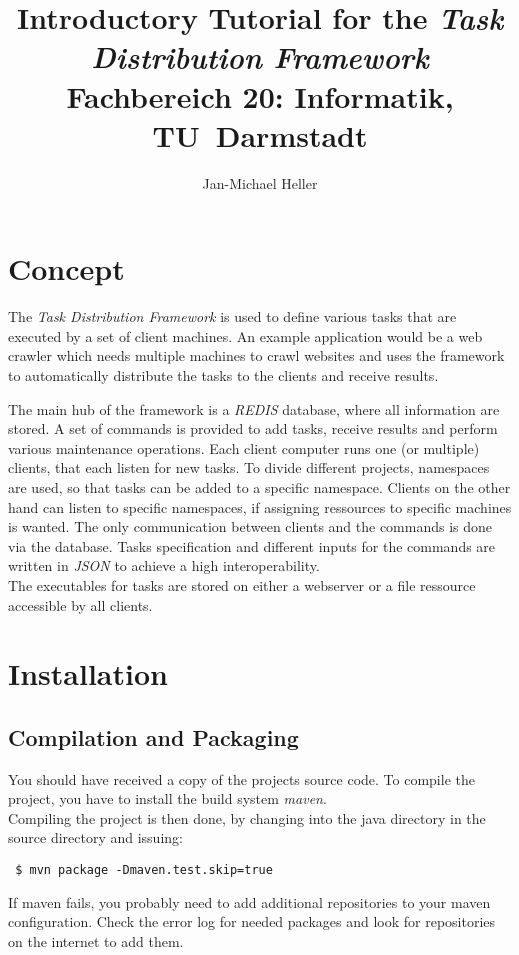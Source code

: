\documentclass[a4paper,11pt]{article}
\title{Introductory Tutorial for the \textit{Task Distribution Framework}
Fachbereich 20: Informatik, \mbox{TU Darmstadt}}
\author{Jan-Michael Heller}
\begin{document}
\maketitle

\setcounter{tocdepth}{2}
\tableofcontents

\newpage

\section{Concept}
The \textit{Task Distribution Framework} is used to define various tasks that are executed by a set of client machines. An example application would be a web crawler which needs multiple machines to crawl websites and uses the framework to automatically distribute the tasks to the clients and receive results.

The main hub of the framework is a \textit{REDIS} database, where all information are stored. A set of commands is provided to add tasks, receive results and perform various maintenance operations. Each client computer runs one (or multiple) clients, that each listen for new tasks. To divide different projects, namespaces are used, so that tasks can be added to a specific namespace. Clients on the other hand can listen to specific namespaces, if assigning ressources to specific machines is wanted. The only communication between clients and the commands is done via the database. Tasks specification and different inputs for the commands are written in \textit{JSON} to achieve a high interoperability.\\
The executables for tasks are stored on either a webserver or a file ressource accessible by all clients.

\newpage

\section{Installation}
\subsection{Compilation and Packaging}
You should have received a copy of the projects source code. To compile the project, you have to install the build system \textit{maven}.\\
Compiling the project is then done, by changing into the java directory in the source directory and issuing:
\begin{verbatim}
 $ mvn package -Dmaven.test.skip=true
\end{verbatim}
If maven fails, you probably need to add additional repositories to your maven configuration. Check the error log for needed packages and look for repositories on the internet to add them.
\end{document}
